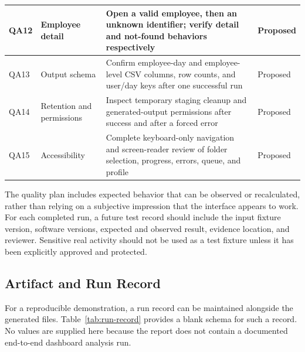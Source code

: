 \begin{longtable}{|p{}|p{}|p{}|p{}|}
QA12 & Employee detail & Open a valid employee, then an unknown identifier; verify detail and not-found behaviors respectively & Proposed\\
\hline
QA13 & Output schema & Confirm employee-day and employee-level CSV columns, row counts, and user/day keys after one successful run & Proposed\\
\hline
QA14 & Retention and permissions & Inspect temporary staging cleanup and generated-output permissions after success and after a forced error & Proposed\\
\hline
QA15 & Accessibility & Complete keyboard-only navigation and screen-reader review of folder selection, progress, errors, queue, and profile & Proposed\\
\hline
\end{longtable}

The quality plan includes expected behavior that can be observed or
recalculated, rather than relying on a subjective impression that the
interface appears to work. For each completed run, a future test record
should include the input fixture version, software versions, expected
and observed result, evidence location, and reviewer. Sensitive real
activity should not be used as a test fixture unless it has been
explicitly approved and protected.

\subsection{Artifact and Run Record}
For a reproducible demonstration, a run record can be maintained
alongside the generated files. Table~\ref{tab:run-record} provides a
blank schema for such a record. No values are supplied here because
the report does not contain a documented end-to-end dashboard analysis
run.


